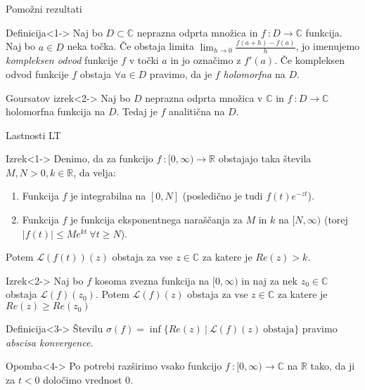 \documentclass[t, 8pt]{beamer} %
\newcommand{\abs}[1]{\ensuremath{\lvert #1 \rvert}}
\newcommand{\mth}[1]{\ensuremath{\mathbb{#1}}}
\newcommand{\R}{\mth{R}}
\newcommand{\C}{\mth{C}}
\newcommand{\pojem}[1]{\emph{#1}}
\newcommand{\map}[3]{\ensuremath{{#1}~: {#2} \rightarrow {#3}}}
\newcommand{\fillblack}[1]{
	\begin{tikzpicture}[remember picture, overlay]
		\node [shift={(0 cm,0cm)}]  at (current page.south west)
		{%
			\begin{tikzpicture}[remember picture, overlay] at (current page.south west)
				\draw [fill=black] (0, 0) -- (0,#1 \paperheight) --
				(\paperwidth,#1 \paperheight) -- (\paperwidth,0) -- cycle ;
			\end{tikzpicture}
		};
		\draw (current page.north west) rectangle (current page.south east);
	\end{tikzpicture}
}
\begin{document}
		\begin{frame}{Pomožni rezultati}
			\begin{block}{Definicija}<1->
				Naj bo $D\subset\C$ neprazna odprta množica in $\map{f}{D}{\C}$ funkcija. Naj bo $a\in D$ neka točka. Če obstaja limita $\lim_{h\to 0}\frac{f(a+h)-f(a)}{h}$, jo imenujemo \pojem{kompleksen odvod} funkcije $f$ v točki $a$ in jo označimo z $f'(a)$. Če kompleksen odvod funkcije $f$ obstaja $\forall a\in D$ pravimo, da je $f$ \pojem{holomorfna} na $D$.
			\end{block}
			
			\begin{block}{Goursatov izrek}<2->
				Naj bo $D$ neprazna odprta množica v $\C$ in $\map{f}{D}{\C}$ holomorfna funkcija na $D$. Tedaj je $f$ analitična na $D$.
			\end{block}
		\end{frame}
		
		\begin{frame}{Lastnosti LT}
			\begin{block}{Izrek}<1->
				Denimo, da za funkcijo $\map{f}{[0, \infty)}{\R}$ obstajajo taka števila $M, N > 0, k\in \R$, da velja: \begin{enumerate}
					\item Funkcija $f$ je integrabilna na $[0, N]$ (posledično je tudi $f(t)e^{-zt}$).
					\item Funkcija $f$ je funkcija eksponentnega naraščanja za $M$ in $k$ na $[N, \infty)$ (torej $\abs{f(t)}\leq Me^{kt}~\forall t\geq N$).
				\end{enumerate}
				Potem $\mathcal{L}(f(t))(z)$ obstaja za vse $z\in\C$ za katere je $Re(z) > k$.
			\end{block}
			
			\begin{block}{Izrek}<2->
				Naj bo $f$ kosoma zvezna funkcija na $[0, \infty)$ in naj za nek $z_0\in\C$ obstaja $\mathcal{L}(f)(z_0)$. Potem $\mathcal{L}(f)(z)$ obstaja za vse $z\in\C$ za katere je $Re(z) \geq Re(z_0)$
			\end{block}
			
			\begin{block}{Definicija}<3->
				Številu $\sigma(f) = \inf\{Re(z)~|~\mathcal{L}(f)(z)~\text{obstaja}\}$ pravimo \pojem{abscisa konvergence}.
			\end{block}
			\begin{block}{Opomba}<4->
				Po potrebi razširimo vsako funkcijo $\map{f}{[0,\infty)}{\C}$ na $\R$ tako, da ji za $t<0$ določimo vrednost $0$.
			\end{block}
		\end{frame}
		
\end{document}
